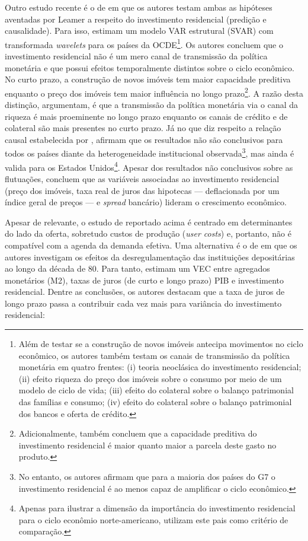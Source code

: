 Outro estudo recente é o de \textcite{huang_is_2018} em que os autores testam ambas as hipóteses aventadas por Leamer a respeito do investimento residencial (predição e causalidade). Para isso, estimam um modelo VAR estrutural (SVAR) com transformada \textit{wavelets} para os países da OCDE\footnote{
	Além de testar se a construção de novos imóveis antecipa movimentos no ciclo econômico, os autores também testam os canais de transmissão da política monetária em quatro frentes: (i) teoria neoclásica do investimento residencial; (ii) efeito riqueza do preço dos imóveis sobre o consumo por meio de um modelo de ciclo de vida; (iii) efeito do colateral sobre o balanço patrimonial das famílias e consumo; (iv) efeito do colateral sobre o balanço patrimonial dos bancos e oferta de crédito.}.  
Os autores concluem que o investimento residencial não é um mero canal de transmissão da política monetária e que possui efeitos temporalmente distintos sobre o ciclo econômico. No curto prazo, a construção de novos imóveis tem maior capacidade preditiva enquanto o preço dos imóveis tem maior influência no longo prazo\footnote{Adicionalmente, \textcite{huang_is_2018} também concluem que a capacidade preditiva do investimento residencial é maior quanto maior a parcela deste gasto no produto.}. A razão desta distinção, argumentam, é que a transmissão da política monetária via o canal da riqueza é mais proeminente no longo prazo enquanto os canais de crédito e de colateral são mais presentes no curto prazo. Já no que diz respeito a relação causal estabelecida por \textcite{leamer_housing_2007}, afirmam que os resultados não são conclusivos para todos os países diante da heterogeneidade institucional observada\footnote{
	No entanto, os autores afirmam que para a maioria dos países do G7 o investimento residencial é ao menos capaz de amplificar o ciclo econômico.}, mas ainda é valida para os Estados Unidos\footnote{
	Apenas para ilustrar a dimensão da importância do investimento residencial para o ciclo econômio norte-americano, \textcite{huang_is_2018} utilizam este pais como critério de comparação.}.
Apesar dos resultados não conclusivos sobre as flutuações, concluem que as variáveis associadas ao investimento residencial (preço dos imóveis, taxa real de juros das hipotecas --- deflacionada por um índice geral de preços --- e \textit{spread} bancário) lideram o crescimento econômico.

Apesar de relevante, o estudo  de \textcite{huang_is_2018} reportado acima é centrado em determinantes do lado da oferta, sobretudo custos de produção (\textit{user costs}) e, portanto, não é compatível com a agenda da demanda efetiva.
Uma alternativa é o de \textcite{gauger_residential_2003} em que os autores investigam os efeitos da desregulamentação das instituições depositárias ao longo da década de 80. Para tanto, estimam um VEC entre agregados monetários (M2), taxas de juros (de curto e longo prazo) PIB e investimento residencial.
Dentre as conclusões, os autores destacam que a taxa de juros de longo prazo passa a contribuir cada vez mais para variância do investimento residencial:

